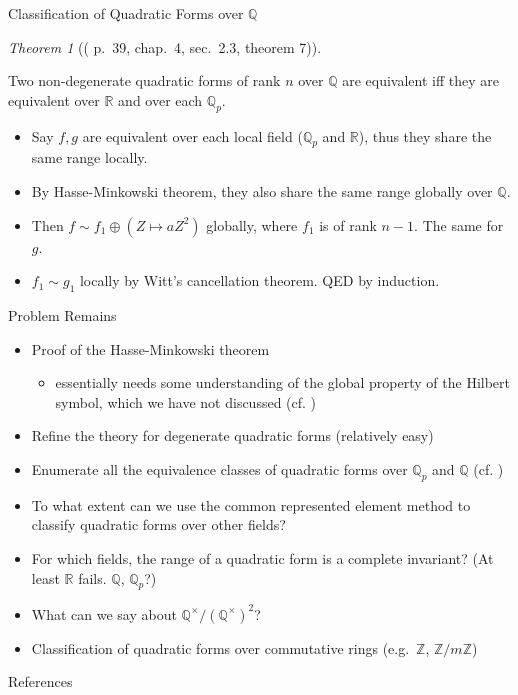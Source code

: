\documentclass[fontset=fandol,envcountsect]{ctexbeamer}
\def\transreferences{参考文献}
\def\transreferences{References}
\providecommand{\tightlist}{%
  \setlength{\itemsep}{0pt}\setlength{\parskip}{0pt}}\usepackage{longtable,booktabs,array}
\theoremstyle{theorem}
\newtheorem{theorem}{定理}
\theoremstyle{example}
\theoremstyle{remark}
\theoremstyle{theorem}
\newtheorem{theorem}{Theorem}
\theoremstyle{example}
\theoremstyle{remark}
\begin{document}
\begin{frame}{Classification of Quadratic Forms over \(\mathbb Q\)}
\label{classification-of-quadratic-forms-over-mathbb-q}
\begin{theorem}[(\autocite{serre_course_1973} p.~39, chap.~4, sec.~2.3,
theorem
7)]\protect\hypertarget{thm-qp-classification}{}\label{thm-qp-classification}

Two non-degenerate quadratic forms of rank \(n\) over \(\mathbb Q\)
are equivalent iff they are equivalent over \(\mathbb R\) and over each
\(\mathbb Q_p\).

\end{theorem}

\begin{itemize}
\item
  Say \(f,g\) are equivalent over each local field (\(\mathbb Q_p\) and
  \(\mathbb R\)), thus they share the same range locally.
\item
  By Hasse-Minkowski theorem, they also share the same range globally
  over \(\mathbb Q\).
\item
  Then \(f \sim f_1 \oplus (Z \mapsto a Z^2)\) globally, where \(f_1\)
  is of rank \(n-1\). The same for \(g\).
\item
  \(f_1 \sim g_1\) locally by Witt's cancellation theorem. QED by
  induction.
\end{itemize}
\end{frame}

\begin{frame}{Problem Remains}
\label{problem-remains}
\begin{itemize}
\item
  Proof of the Hasse-Minkowski theorem

  \begin{itemize}
  \tightlist
  \item
    essentially needs some understanding of the global property of the
    Hilbert symbol, which we have not discussed (cf.
    \autocite{serre_course_1973})
  \end{itemize}
\item
  Refine the theory for degenerate quadratic forms (relatively easy)
\item
  Enumerate all the equivalence classes of quadratic forms over
  \(\mathbb Q_p\) and \(\mathbb Q\) (cf. \autocite{serre_course_1973})
\item
  To what extent can we use the common represented element method to
  classify quadratic forms over other fields?
\item
  For which fields, the range of a quadratic form is a complete
  invariant? (At least \(\mathbb R\) fails. \(\mathbb Q\),
  \(\mathbb Q_p\)?)
\item
  What can we say about \(\mathbb Q^\times / (\mathbb Q^\times)^2\)?
\item
  Classification of quadratic forms over commutative rings
  (e.g.~\(\mathbb Z\), \(\mathbb Z / m \mathbb Z\))
\end{itemize}
\end{frame}

\begin{frame}[allowframebreaks]{\transreferences}
    \printbibliography[heading=none]
\end{frame}
\end{document}
